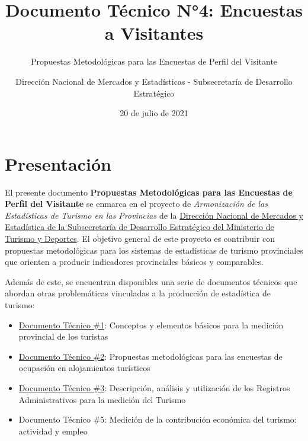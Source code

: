 \documentclass[
]{book}
\title{Documento Técnico N°4: Encuestas a Visitantes}
\subtitle{Propuestas Metodológicas para las Encuestas de Perfil del Visitante}
\author{Dirección Nacional de Mercados y Estadísticas - Subsecretaría de Desarrollo Estratégico}
\date{20 de julio de 2021}
\let\oldmaketitle\maketitle
\begin{document}
\maketitle


\newpage

\let\maketitle\oldmaketitle
\maketitle

{
\setcounter{tocdepth}{1}
\tableofcontents
}
\hypertarget{presentaciuxf3n}{%
\chapter*{\texorpdfstring{\textbf{Presentación}}{Presentación}}\label{presentaciuxf3n}}

El presente documento \textbf{Propuestas Metodológicas para las Encuestas de Perfil del Visitante} se enmarca en el proyecto de \emph{Armonización de las Estadísticas de Turismo en las Provincias} de la \href{http://datos.yvera.gob.ar/}{Dirección Nacional de Mercados y Estadística de la Subsecretaría de Desarrollo Estratégico del Ministerio de Turismo y Deportes}. El objetivo general de este proyecto es contribuir con propuestas metodológicas para los sistemas de estadísticas de turismo provinciales que orienten a producir indicadores provinciales básicos y comparables.

Además de este, se encuentran disponibles una serie de documentos técnicos que abordan otras problemáticas vinculadas a la producción de estadística de turismo:

\begin{itemize}
\item
  \href{https://dnme-minturdep.github.io/DT1_medicion_turismo/}{Documento Técnico \#1}: Conceptos y elementos básicos para la medición provincial de los turistas
\item
  \href{https://dnme-minturdep.github.io/DT2_encuestas/}{Documento Técnico \#2}: Propuestas metodológicas para las encuestas de ocupación en alojamientos turísticos
\item
  \href{https://dnme-minturdep.github.io/DT3_registros_adminsitrativos/}{Documento Técnico \#3}: Descripción, análisis y utilización de los Registros Administrativos para la medición del Turismo
\item
  Documento Técnico \#5: Medición de la contribución económica del turismo: actividad y empleo
\end{itemize}
\end{document}
